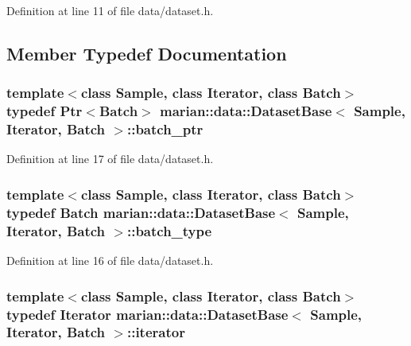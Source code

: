 Definition at line 11 of file data/dataset.\+h.



\subsection{Member Typedef Documentation}
\subsubsection[{\texorpdfstring{batch\+\_\+ptr}{batch_ptr}}]{\setlength{\rightskip}{0pt plus 5cm}template$<$class Sample, class Iterator, class Batch$>$ typedef {\bf Ptr}$<${\bf Batch}$>$ {\bf marian\+::data\+::\+Dataset\+Base}$<$ Sample, Iterator, {\bf Batch} $>$\+::{\bf batch\+\_\+ptr}}\hypertarget{classmarian_1_1data_1_1DatasetBase_a4cb5e9051a072fcc61ed4638862f01f5}{}\label{classmarian_1_1data_1_1DatasetBase_a4cb5e9051a072fcc61ed4638862f01f5}


Definition at line 17 of file data/dataset.\+h.

\subsubsection[{\texorpdfstring{batch\+\_\+type}{batch_type}}]{\setlength{\rightskip}{0pt plus 5cm}template$<$class Sample, class Iterator, class Batch$>$ typedef {\bf Batch} {\bf marian\+::data\+::\+Dataset\+Base}$<$ Sample, Iterator, {\bf Batch} $>$\+::{\bf batch\+\_\+type}}\hypertarget{classmarian_1_1data_1_1DatasetBase_a8dd8e5fa405155eb3207e5aaa4fbdc0f}{}\label{classmarian_1_1data_1_1DatasetBase_a8dd8e5fa405155eb3207e5aaa4fbdc0f}


Definition at line 16 of file data/dataset.\+h.

\subsubsection[{\texorpdfstring{iterator}{iterator}}]{\setlength{\rightskip}{0pt plus 5cm}template$<$class Sample, class Iterator, class Batch$>$ typedef Iterator {\bf marian\+::data\+::\+Dataset\+Base}$<$ Sample, Iterator, {\bf Batch} $>$\+::{\bf iterator}}\hypertarget{classmarian_1_1data_1_1DatasetBase_a5ab99390e2f5f8c7eab612977ae64f38}{}\label{classmarian_1_1data_1_1DatasetBase_a5ab99390e2f5f8c7eab612977ae64f38}


